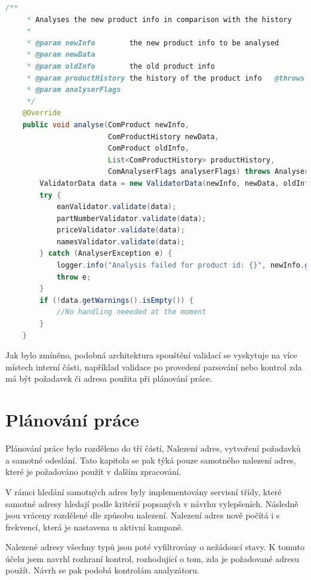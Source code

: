 \documentclass[thesis=B,czech]{FITthesis}[2012/06/26]
\begin{document}
\par
\begin{lstlisting}[language=Java, caption={Původní implementace hlavní metody ve třídě zajišťující spouštění validací analyzátoru}]
    /**
     * Analyses the new product info in comparison with the history
     *
     * @param newInfo        the new product info to be analysed
     * @param newData
     * @param oldInfo        the old product info
     * @param productHistory the history of the product info   @throws AnalyserException when analysing fails, contains error type
     * @param analyserFlags
     */
    @Override
    public void analyse(ComProduct newInfo,
                        ComProductHistory newData,
                        ComProduct oldInfo,
                        List<ComProductHistory> productHistory,
                        ComAnalyserFlags analyserFlags) throws AnalyserException {
        ValidatorData data = new ValidatorData(newInfo, newData, oldInfo, productHistory, analyserFlags);
        try {
            eanValidator.validate(data);
            partNumberValidator.validate(data);
            priceValidator.validate(data);
            namesValidator.validate(data);
        } catch (AnalyserException e) {
            logger.info("Analysis failed for product id: {}", newInfo.getProductId(), e);
            throw e;
        }
        if (!data.getWarnings().isEmpty()) {
            //No handling neeeded at the moment
        }
    }
\end{lstlisting}
Jak bylo zmíněno, podobná architektura spouštění validací se vyskytuje na více místech interní části, například validace po provedení
parsování nebo kontrol zda má být požadavek či adresa použita při plánování práce.


\section{Plánování práce}
Plánování práce bylo rozděleno do tří částí, Nalezení adres, vytvoření požadavků a samotné odeslání.
Tato kapitola se pak týká pouze samotného nalezení adres, které je požadováno použít v dalším zpracování.
\par
V rámci hledání samotných adres byly implementovány servisní třídy, které samotné adresy hledají podle kritérií popsaných v 
návrhu vylepšeních. Následně jsou vráceny rozdělené dle způsobu nalezení. Nalezení adres nově počítá i s frekvencí, 
která je nastavena u aktivní kampaně.
\par
Nalezené adresy všechny typů jsou poté vyfiltrovány o nežádoucí stavy. K tomuto účelu jsem navrhl rozhraní kontrol, rozhodující 
o tom, zda je požadované adresu použít. Návrh se pak podobá kontrolám analyzátoru.
\end{document}
